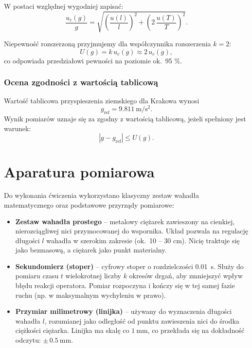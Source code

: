 \documentclass{fizykalab}
\begin{document}
\vspace{1em} \noindent
W postaci względnej wygodniej zapisać:
\begin{equation}
  \frac{u_c(g)}{g} =
  \sqrt{
    \left(\frac{u(l)}{l}\right)^2 +
  \left(2\,\frac{u(T)}{T}\right)^2 }.
\end{equation}

\vspace{1em} \noindent
Niepewność rozszerzoną przyjmujemy dla współczynnika rozszerzenia
\(k = 2\):
\begin{equation}
  U(g) = k\,u_c(g) \approx 2\,u_c(g),
\end{equation}
co odpowiada przedziałowi pewności na poziomie ok.~95 \%.

\subsubsection*{Ocena zgodności z wartością tablicową}

Wartość tablicowa przyspieszenia ziemskiego dla Krakowa wynosi
\[
  g_{\text{ref}} = \SI{9.811}{\meter\per\second\squared}.
\]
Wynik pomiarów uznaje się za zgodny z wartością tablicową,
jeżeli spełniony jest warunek:
\begin{equation}
  |g - g_{\text{ref}}| \le U(g).
\end{equation}

\section{Aparatura pomiarowa}

Do wykonania ćwiczenia wykorzystano klasyczny zestaw wahadła
matematycznego oraz podstawowe przyrządy pomiarowe:

\begin{itemize}
  \item \textbf{Zestaw wahadła prostego} – metalowy ciężarek zawieszony
    na cienkiej, nierozciągliwej nici przymocowanej do wspornika.
    Układ pozwala na regulację długości \(l\) wahadła w szerokim
    zakresie (ok.\ 10 – 30 cm). Nicię traktuje się jako bezmasową,
    a ciężarek jako punkt materialny.
  \item \textbf{Sekundomierz (stoper)} – cyfrowy stoper o rozdzielczości
    \SI{0.01}{\second}. Służy do pomiaru czasu \(t\) wielokrotnej
    liczby \(k\) okresów drgań, aby zmniejszyć wpływ błędu reakcji
    operatora. Pomiar rozpoczyna i kończy się w tej samej fazie ruchu
    (np. w maksymalnym wychyleniu w prawo).
  \item \textbf{Przymiar milimetrowy (linijka)} – używany do wyznaczenia
    długości wahadła \(l\), rozumianej jako odległość od punktu
    zawieszenia nici do środka ciężkości ciężarka. Linijka ma skalę
    co \(\SI{1}{\milli\meter}\), co przekłada się na dokładność
    odczytu: \(\pm\,\SI{0.5}{\milli\meter}\).
\end{itemize}
\end{document}
